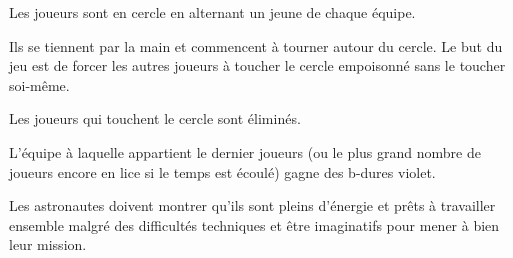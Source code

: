 \documentclass{grand-jeu}
\begin{document}
\begin{liste-materiel}
\end{liste-materiel}

\begin{regles}
Les joueurs sont en cercle en alternant un jeune de chaque équipe.

Ils se tiennent par la main et commencent à tourner autour du cercle. Le but du jeu est de forcer les autres joueurs à toucher le cercle empoisonné sans le toucher soi-même. 

Les joueurs qui touchent le cercle sont éliminés.

L'équipe à laquelle appartient le dernier joueurs (ou le plus grand nombre de joueurs encore en lice si le temps est écoulé) gagne des b-dures violet.
\end{regles}

\begin{imaginaire} 
Les astronautes doivent montrer qu'ils sont pleins d'énergie et prêts à travailler ensemble malgré des difficultés techniques et être imaginatifs  pour mener à bien leur mission. 
\end{imaginaire}

\begin{moments-stop}
\end{moments-stop}
\end{document}
